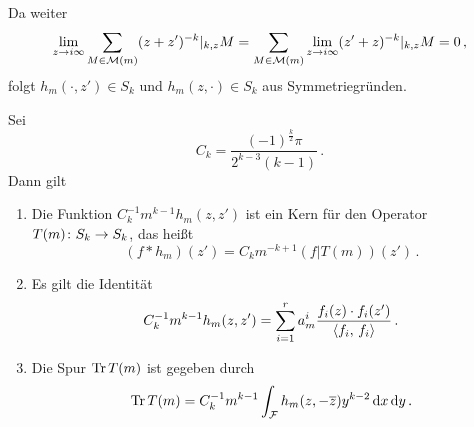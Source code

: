 Da weiter
\begin{align*}
\lim_{z \to i\infty} \sum_{M \in \mathcal{M}(m)} (z+z')^{-k}|_{k,z} M
= \sum_{M \in \mathcal{M}(m)} \lim_{z \to i\infty} (z'+z)^{-k}|_{k,z} M
= 0\,,
\end{align*}
folgt $h_m(\cdot, z') \in S_k$ und $h_m(z, \cdot) \in S_k$ aus Symmetriegründen.


\begin{satz}\label{analytischeSpurformel}
	Sei
	\begin{equation}%
	C_k = \frac{(-1)^{\frac{k}{2}} \pi}{2^{k-3}(k-1)}\,.
	\end{equation}
	Dann gilt
	\begin{enumerate}
		\item Die Funktion $C_k^{-1} m^{k-1} h_m(z,z')$ ist ein Kern für den Operator $T(m)\colon S_k \rightarrow S_k$, das heißt
		\begin{equation}\label{eq:faltung_hm}%
		(f * h_m)(z') = C_km^{-k+1} (f|T(m))(z')
		\,.
		\end{equation}
		\item Es gilt die Identität 
		\begin{equation}%
		C_k^{-1} m^{k-1} h_m(z,z') = \sum_{i=1}^r a_m^i \frac{f_i(z) \cdot f_i(z')}{\scalarprd{f_i}{f_i}}
		\,.
		\end{equation}
		\item Die Spur $\operatorname{Tr} T(m)$ ist gegeben durch
		\begin{equation}%
		\Tr T(m) = C_k^{-1} m^{k-1} \int_\F h_m(z, -\conj z) y^{k-2} \opd x \opd y
		\,.
		\end{equation}
	\end{enumerate}
\end{satz}

